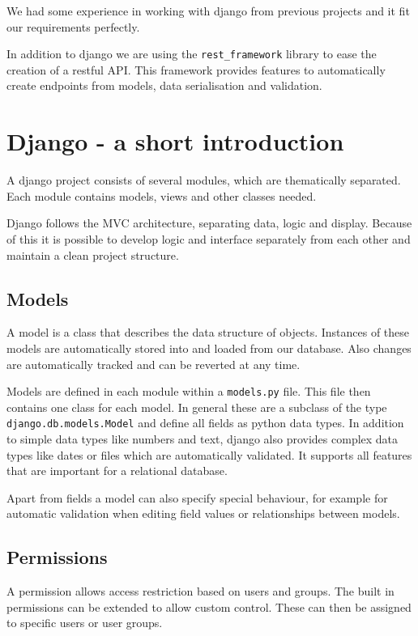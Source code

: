 We had some experience in working with django from previous projects and
it fit our requirements perfectly.

In addition to django we are using the \texttt{rest\_framework} library
to ease the creation of a restful API. This framework provides features
to automatically create endpoints from models, data serialisation and
validation.

\newpage
\newpage
\section{Django - a short
introduction}\label{django---a-short-introduction}

A django project consists of several modules, which are thematically
separated. Each module contains models, views and other classes needed.

Django follows the MVC architecture, separating data, logic and display.
Because of this it is possible to develop logic and interface separately
from each other and maintain a clean project structure.

\subsection{Models}\label{models-1}

A model is a class that describes the data structure of objects.
Instances of these models are automatically stored into and loaded from
our database. Also changes are automatically tracked and can be reverted
at any time.

Models are defined in each module within a \texttt{models.py} file. This
file then contains one class for each model. In general these are a
subclass of the type \texttt{django.db.models.Model} and define all
fields as python data types. In addition to simple data types like
numbers and text, django also provides complex data types like dates or
files which are automatically validated. It supports all features that
are important for a relational database.

Apart from fields a model can also specify special behaviour, for example
for automatic validation when editing field values or relationships
between models.

\subsection{Permissions}\label{permissions}

A permission allows access restriction based on users and groups. The
built in permissions can be extended to allow custom control. These can
then be assigned to specific users or user groups.

